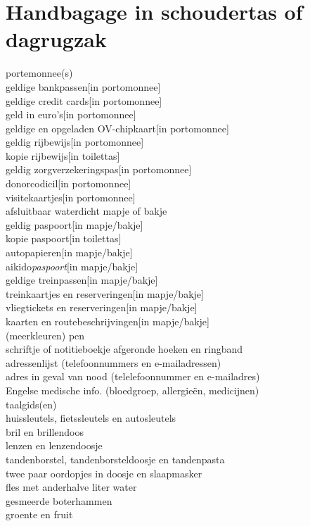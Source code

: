 \documentclass[9pt,twocolumn]{memoir}
\begin{document}
\section*{Handbagage in schoudertas of dagrugzak}
portemonnee(s)\\
geldige bankpassen\hfill[in portomonnee]\\
geldige credit cards\hfill[in portomonnee]\\
geld in euro's\hfill[in portomonnee]\\
geldige en opgeladen OV-chipkaart\hfill[in portomonnee]\\
geldig rijbewijs\hfill[in portomonnee]\\
kopie rijbewijs\hfill[in toilettas]\\
geldig zorgverzekeringspas\hfill[in portomonnee]\\
donorcodicil\hfill[in portomonnee]\\
visitekaartjes\hfill[in portomonnee]\\
afsluitbaar waterdicht mapje of bakje\\
geldig paspoort\hfill[in mapje/bakje]\\
kopie paspoort\hfill[in toilettas]\\
autopapieren\hfill[in mapje/bakje]\\
aikido{\itshape{paspoort}}\hfill[in mapje/bakje]\\
geldige treinpassen\hfill[in mapje/bakje]\\
treinkaartjes en reserveringen\hfill[in mapje/bakje]\\
vliegtickets en reserveringen\hfill[in mapje/bakje]\\
kaarten en routebeschrijvingen\hfill[in mapje/bakje]\\
(meerkleuren) pen\\
schriftje of notitieboekje afgeronde hoeken en ringband\\
adressenlijst (telefoonnummers en e-mailadressen)\\
adres in geval van nood (telelefoonnummer en e-mailadres)\\
Engelse medische info. (bloedgroep, allergieën, medicijnen)\\
taalgids(en)\\
huissleutels, fietssleutels en autosleutels\\
bril en brillendoos\\
lenzen en lenzendoosje\\
tandenborstel, tandenborsteldoosje en tandenpasta\\
twee paar oordopjes in doosje en slaapmasker\\
fles met anderhalve liter water\\
gesmeerde boterhammen\\
groente en fruit
\end{document}
